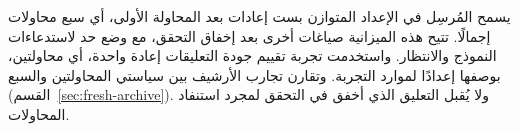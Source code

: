 يسمح المُرسِل في الإعداد المتوازن بست إعادات بعد المحاولة الأولى، أي سبع محاولات إجمالًا. تتيح هذه الميزانية صياغات أخرى بعد إخفاق التحقق، مع وضع حد لاستدعاءات النموذج والانتظار. واستخدمت تجربة تقييم جودة التعليقات إعادة واحدة، أي محاولتين، بوصفها إعدادًا لموارد التجربة. وتقارن تجارب الأرشيف بين سياستي المحاولتين والسبع (القسم~\ref{sec:fresh-archive}). ولا يُقبل التعليق الذي أخفق في التحقق لمجرد استنفاد المحاولات.




